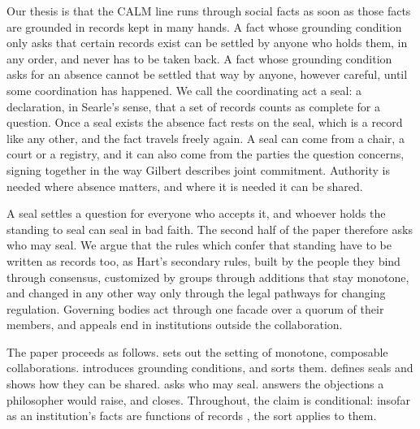 Our thesis is that the CALM line runs through social facts as soon as those facts are grounded in
records kept in many hands. A fact whose grounding condition only asks that certain records exist
can be settled by anyone who holds them, in any order, and never has to be taken back. A fact whose
grounding condition asks for an absence cannot be settled that way by anyone, however careful, until
some coordination has happened. We call the coordinating act a seal: a declaration, in Searle's
sense, that a set of records counts as complete for a question. Once a seal exists the absence fact
rests on the seal, which is a record like any other, and the fact travels freely again. A seal can
come from a chair, a court or a registry, and it can also come from the parties the question
concerns, signing together in the way Gilbert describes joint commitment. Authority is needed where
absence matters, and where it is needed it can be shared.

A seal settles a question for everyone who accepts it, and whoever holds the standing to seal can
seal in bad faith. The second half of the paper therefore asks who may seal. We argue that the rules
which confer that standing have to be written as records too, as Hart's secondary rules, built by the
people they bind through consensus, customized by groups through additions that stay monotone, and
changed in any other way only through the legal pathways for changing regulation. Governing bodies
act through one facade over a quorum of their members, and appeals end in institutions outside the
collaboration.

The paper proceeds as follows.  sets out the setting of monotone, composable
collaborations.  introduces grounding conditions, and  sorts
them.  defines seals and shows how they can be shared. 
asks who may seal.  answers the objections a philosopher would raise, and 
closes. Throughout, the claim is conditional: insofar as an institution's facts are functions of
records \citep{ferraris2013}, the sort applies to them.
